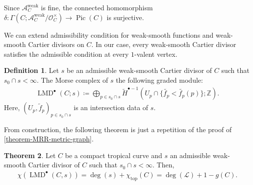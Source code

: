 \documentclass[a4paper,dvipdfmx,reqno,12pt]{amsart}
\theoremstyle{definition}
\newtheorem{theorem}{Theorem}[section]
\newtheorem{definition}[theorem]{Definition}
\newcommand{\deq}{\coloneqq}
\newcommand{\opn}[1]{\operatorname{#1}}
\numberwithin{equation}{section}
\begin{document}
Since $\mathcal{A}_C^{\opn{weak}}$ is fine, 
the connected homomorphism 
$\delta\colon \Gamma(C;\mathcal{A}_C^{\opn{weak}}/
\mathcal{O}^{\times}_C)\to \opn{Pic}(C)$ is 
surjective.


We can extend admissibility condition for
weak-smooth functions and weak-smooth Cartier 
divisors on $C$. In our case, every weak-smooth 
Cartier divisor satisfies the admissible condition 
at every $1$-valent vertex.
\begin{definition}
Let $s$ be an admissible weak-smooth Cartier divisor 
of $C$ such that $s_0\cap s<\infty$.
The Morse complex of $s$ the following graded module:
\begin{align}
  \opn{LMD}^{\bullet}(C;s)\deq \bigoplus_{p\in s_0\cap s} 
\tilde{H}^{\bullet-1}
(U_p\cap \{\tilde{f_p}<\tilde{f_p}(p)\};\mathbb{Z}).
\end{align}
Here, $(U_p,\tilde{f}_p)_{p\in s_0\cap s}$ is an
intersection data of $s$.
\end{definition}

From construction, the following theorem is just a
repetition of the proof of 
\cref{theorem-MRR-metric-graph}.

\begin{theorem} \label{theorem-MRR-tropical-curve}
Let $C$ be a compact tropical curve and 
$s$ an admissible weak-smooth Cartier divisor 
of $C$ such that $s_0\cap s<\infty$. Then,
\begin{align}
  \chi(\opn{LMD}^{\bullet}(C,s))=\opn{deg}(s)+
\chi_{\opn{top}}(C)=\opn{deg}(\mathcal{L})+1-g(C).
\end{align}
\end{theorem}
\end{document}
